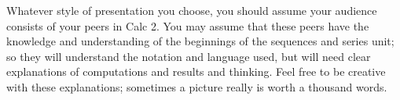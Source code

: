 \documentclass[12pt]{amsart}
\begin{document}
\medskip

Whatever style of presentation you choose, you should assume your audience consists of your peers in Calc 2.  You may assume that these peers have the knowledge and understanding of the beginnings of the sequences and series unit; so they will understand the notation and language used, but will need clear explanations of computations and results and thinking.  Feel free to be creative with these explanations; sometimes a picture really is worth a thousand words.
\end{document}
